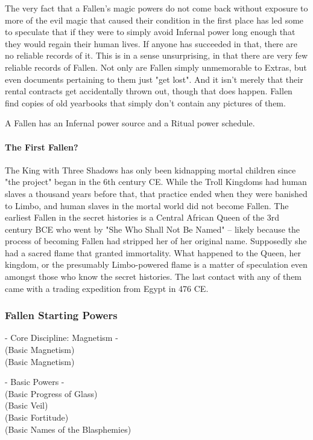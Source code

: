 The very fact that a Fallen's magic powers do not come back without exposure to more of the evil magic that caused their condition in the first place has led some to speculate that if they were to simply avoid Infernal power long enough that they would regain their human lives. If anyone has succeeded in that, there are no reliable records of it. This is in a sense unsurprising, in that there are very few reliable records of Fallen. Not only are Fallen simply unmemorable to Extras, but even documents pertaining to them just "get lost". And it isn't merely that their rental contracts get accidentally thrown out, though that does happen. Fallen find copies of old yearbooks that simply don't contain any pictures of them.

A Fallen has an Infernal power source and a Ritual power schedule.
\paragraph{The First Fallen?} The King with Three Shadows has only been kidnapping mortal children since "the project" began in the 6th century CE. While the Troll Kingdoms had human slaves a thousand years before that, that practice ended when they were banished to Limbo, and human slaves in the mortal world did not become Fallen. The earliest Fallen in the secret histories is a Central African Queen of the 3rd century BCE who went by "She Who Shall Not Be Named" -- likely because the process of becoming Fallen had stripped her of her original name. Supposedly she had a sacred flame that granted immortality. What happened to the Queen, her kingdom, or the presumably Limbo-powered flame is a matter of speculation even amongst those who know the secret histories. The last contact with any of them came with a trading expedition from Egypt in 476 CE.

\subsubsection{Fallen Starting Powers}

\hspace{\parindent} - Core Discipline: Magnetism -\\
 (Basic Magnetism)\\
 (Basic Magnetism)

- Basic Powers -\\
 (Basic Progress of Glass)\\
 (Basic Veil)\\
 (Basic Fortitude)\\
 (Basic Names of the Blasphemies)

